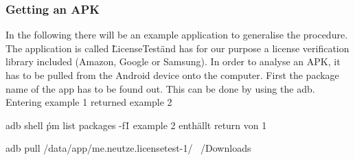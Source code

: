 \subsubsection{Getting an APK}\label{subsubsection:tools-apk}
In the following there will be an example application to generalise the procedure. The application is called \"LicenseTest\" and has for our purpose a license verification library included (Amazon, Google or Samsung).\newline
In order to analyse an \gls{APK}, it has to be pulled from the Android device onto the computer. First the package name of the app has to be found out. This can be done by using the \gls{adb}. Entering example 1 returned example 2

adb shell \'pm list packages -f\' 1
example 2 enthällt return von 1


adb pull /data/app/me.neutze.licensetest-1/ ~/Downloads
